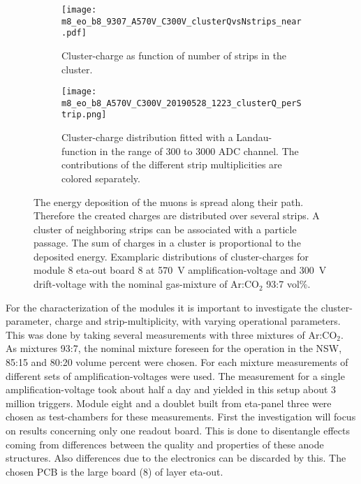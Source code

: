 \documentclass[
twoside,            %
BCOR1.4cm,          %
10pt,               %
headings=normal,    %
headsepline,        %
clearplainpage,		%
final,              %
div=14,
open=right,
bibliography=toc
]{scrreprt}
\begin{document}
\begin{figure}[!h]
	\begin{subfigure}[b]{0.48\textwidth}
		\centering
		\texttt{[image: m8\_eo\_b8\_9307\_A570V\_C300V\_clusterQvsNstrips\_near.pdf]}
		\caption{
			Cluster-charge as function of number of strips in the cluster.
		}
		\label{m8_eo_b8_9307_A570V_C300V_clusterQvsNstrips_near} 
	\end{subfigure}
	\hfill
	\begin{subfigure}[b]{0.48\textwidth}
		\centering
		\texttt{[image: m8\_eo\_b8\_A570V\_C300V\_20190528\_1223\_clusterQ\_perStrip.png]}
		\caption{
			Cluster-charge distribution fitted with a Landau-function in the range of 300 to 3000 ADC channel.
			The contributions of the different strip multiplicities are colored separately.
		}
		\label{m8_eo_b8_A570V_C300V_20190528_1223_clusterQ_perStrip} 
	\end{subfigure}
	\vspace{-2mm}
	\caption{
		The energy deposition of the muons is spread along their path.
		Therefore the created charges are distributed over several strips.
		A cluster of neighboring strips can be associated with a particle passage.
		The sum of charges in a cluster is proportional to the deposited energy.
		Examplaric distributions of cluster-charges for module 8 eta-out board 8 at \SI{570}{V} amplification-voltage and \SI{300}{V} drift-voltage with the nominal gas-mixture of Ar:CO$_{2}$ 93:7 vol\%.
	}
\end{figure}

For the characterization of the modules it is important to investigate the cluster-parameter, charge and strip-multiplicity, with varying operational parameters.
This was done by taking several measurements with three mixtures of Ar:CO$_{2}$.
As mixtures 93:7, the nominal mixture foreseen for the operation in the NSW, 85:15 and 80:20 volume percent were chosen.
For each mixture measurements of different sets of amplification-voltages were used.
The measurement for a single amplification-voltage took about half a day and yielded in this setup about 3 million triggers.
Module eight and a doublet built from eta-panel three were chosen as test-chambers for these measurements.
First the investigation will focus on results concerning only one readout board.
This is done to disentangle effects coming from differences between the quality and properties of these anode structures.
Also differences due to the electronics can be discarded by this.
The chosen PCB is the large board (8) of layer eta-out.
\end{document}
